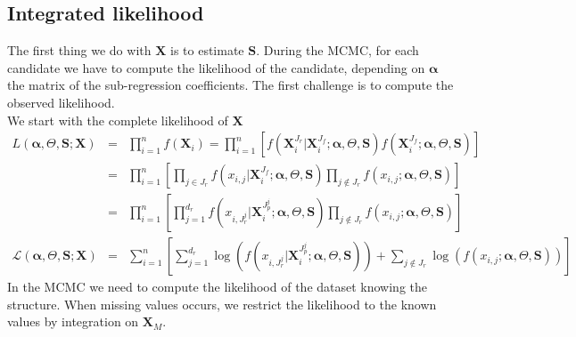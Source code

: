\documentclass[12pt,a4paper]{report}
\begin{document}
\subsection{Integrated likelihood}
The first thing we do with $\boldsymbol{X}$ is to estimate $\boldsymbol{S}$.
	 During the MCMC, for each candidate we have to compute the likelihood of the candidate, depending on $\boldsymbol{\alpha}$ the matrix of the sub-regression coefficients. The first challenge is to compute the observed likelihood.\\
	 
We start with the complete likelihood of $\boldsymbol{X}$
\begin{eqnarray}
	L(\boldsymbol{\alpha},\Theta,\boldsymbol{S};\boldsymbol{X})&=& \prod_{i=1}^n f(\boldsymbol{X}_i)= \prod_{i=1}^n\left[f(\boldsymbol{X}_i^{J_r}|\boldsymbol{X}_i^{J_f};\boldsymbol{\alpha},\Theta,\boldsymbol{S})f(\boldsymbol{X}_i^{J_f};\boldsymbol{\alpha},\Theta,\boldsymbol{S}) \right] \\
	&=&\prod_{i=1}^n\left[\prod_{j \in J_r}f(x_{i,j}|\boldsymbol{X}_i^{J_f};\boldsymbol{\alpha},\Theta,\boldsymbol{S})\prod_{j \notin J_r} f(x_{i,j};\boldsymbol{\alpha},\Theta,\boldsymbol{S}) \right] \\
	&=&\prod_{i=1}^n\left[\prod_{j =1}^{d_r}f(x_{i,J_r^j}|\boldsymbol{X}_i^{J_p^j};\boldsymbol{\alpha},\Theta,\boldsymbol{S})\prod_{j \notin J_r} f(x_{i,j};\boldsymbol{\alpha},\Theta,\boldsymbol{S}) \right] \\
	\mathcal{L}(\boldsymbol{\alpha},\Theta,\boldsymbol{S};\boldsymbol{X})&=&\sum_{i=1}^n\left[\sum_{j =1}^{d_r}\log \left(f(x_{i,J_r^j}|\boldsymbol{X}_i^{J_p^j};\boldsymbol{\alpha},\Theta,\boldsymbol{S})\right)+\sum_{j \notin J_r} \log \left(f(x_{i,j};\boldsymbol{\alpha},\Theta,\boldsymbol{S})\right) \right] \label{loglikmiss}
\end{eqnarray}
		In the MCMC we need to compute the likelihood of the dataset knowing the structure. When missing values occurs, we restrict the likelihood to the known values by integration on $\boldsymbol{X}_M$.
\end{document}
